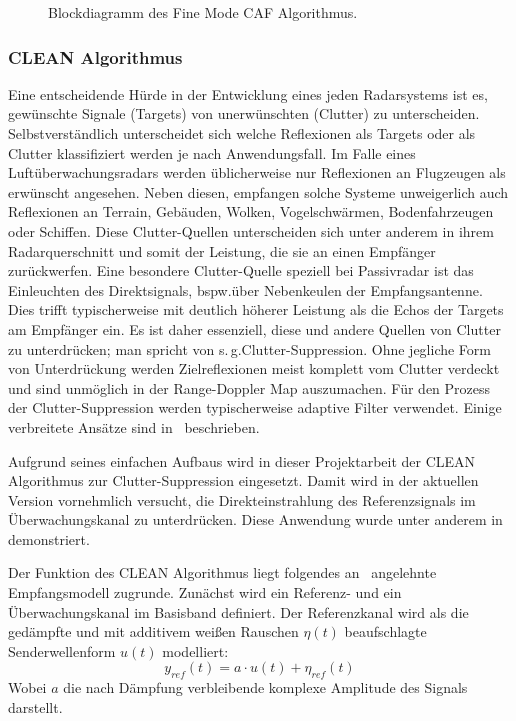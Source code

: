 \begin{figure}[htb]

    \caption{Blockdiagramm des Fine Mode CAF Algorithmus.\label{fig:caf_fine_mode_schematics}}
\end{figure}

\subsubsection{CLEAN Algorithmus}

Eine entscheidende Hürde in der Entwicklung eines jeden Radarsystems ist es, gewünschte Signale (Targets) von unerwünschten (Clutter) zu unterscheiden. Selbstverständlich unterscheidet sich welche Reflexionen als Targets oder als Clutter klassifiziert werden je nach Anwendungsfall. Im Falle eines Luftüberwachungsradars werden üblicherweise nur Reflexionen an Flugzeugen als erwünscht angesehen. Neben diesen, empfangen solche Systeme unweigerlich auch Reflexionen an Terrain, Gebäuden, Wolken, Vogelschwärmen, Bodenfahrzeugen oder Schiffen. Diese Clutter-Quellen unterscheiden sich unter anderem in ihrem Radarquerschnitt und somit der Leistung, die sie an einen Empfänger zurückwerfen. Eine besondere Clutter-Quelle speziell bei Passivradar ist das Einleuchten des Direktsignals, bspw.\@ über Nebenkeulen der Empfangsantenne. Dies trifft typischerweise mit deutlich höherer Leistung als die Echos der Targets am Empfänger ein. Es ist daher essenziell, diese und andere Quellen von Clutter zu unterdrücken; man spricht von s.\,g.\@ Clutter-Suppression. Ohne jegliche Form von Unterdrückung werden Zielreflexionen meist komplett vom Clutter verdeckt und sind unmöglich in der Range-Doppler Map auszumachen. Für den Prozess der Clutter-Suppression werden typischerweise adaptive Filter verwendet. Einige verbreitete Ansätze sind in~\cite[S.~177--202]{Malanowski2019} beschrieben.

Aufgrund seines einfachen Aufbaus wird in dieser Projektarbeit der CLEAN Algorithmus zur Clutter-Suppression eingesetzt. Damit wird in der aktuellen Version vornehmlich versucht, die Direkteinstrahlung des Referenzsignals im Überwachungskanal zu unterdrücken. Diese Anwendung wurde unter anderem in~\cite{Feng2013} demonstriert.

Der Funktion des CLEAN Algorithmus liegt folgendes an~\cite{Kulpa2008} angelehnte Empfangsmodell zugrunde. Zunächst wird ein Referenz- und ein Überwachungskanal im Basisband definiert. Der Referenzkanal wird als die gedämpfte und mit additivem weißen Rauschen \(\eta (t)\) beaufschlagte Senderwellenform \(u (t)\) modelliert:
%
\begin{equation}
    y_{ref} (t) = a \cdot u (t) + \eta_{ref} (t)
\end{equation}\label{equ:clean_reference_channel}%
%
Wobei \(a\) die nach Dämpfung verbleibende komplexe Amplitude des Signals darstellt.


